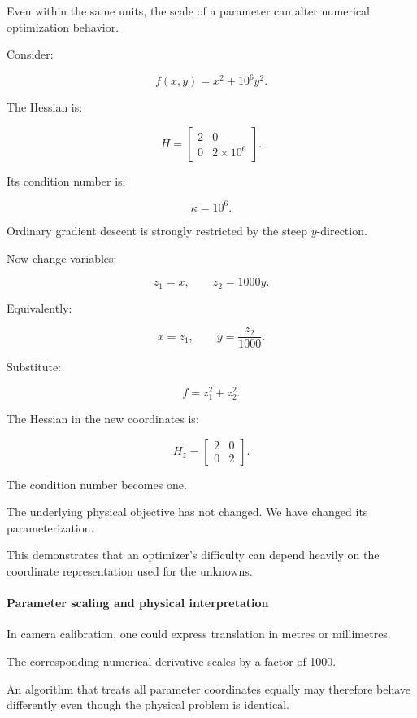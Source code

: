 Even within the same units, the scale of a parameter can alter numerical optimization behavior.

Consider:

\[
f(x,y)=x^2+10^6y^2.
\]

The Hessian is:

\[
H= \begin{bmatrix} 2&0\\ 0&2\times10^6 \end{bmatrix}.
\]

Its condition number is:

\[
\kappa=10^6.
\]

Ordinary gradient descent is strongly restricted by the steep \(y\)-direction.

Now change variables:

\[
z_1=x,\qquad z_2=1000y.
\]

Equivalently:

\[
x=z_1,\qquad y=\frac{z_2}{1000}.
\]

Substitute:

\[
f=z_1^2+z_2^2.
\]

The Hessian in the new coordinates is:

\[
H_z= \begin{bmatrix} 2&0\\ 0&2 \end{bmatrix}.
\]

The condition number becomes one.

The underlying physical objective has not changed. We have changed its parameterization.

This demonstrates that an optimizer's difficulty can depend heavily on the coordinate representation used for the unknowns.

\paragraph{Parameter scaling and physical interpretation}\label{02-foundations-ii-ch027-parameter-scaling-and-physical-interpretation}

\hypertarget{02-foundations-ii-ch027-parameter-scaling-and-physical-interpretation}{}

In camera calibration, one could express translation in metres or millimetres.

The corresponding numerical derivative scales by a factor of 1000.

An algorithm that treats all parameter coordinates equally may therefore behave differently even though the physical problem is identical.

